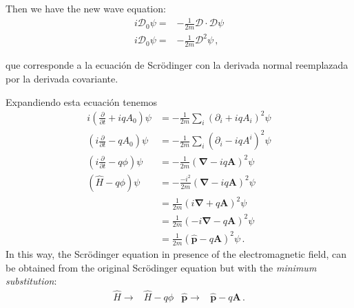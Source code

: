 Then we have the new wave equation:
\begin{align}
  i\mathcal{D}_0\psi=&-\frac{1}{2m}\boldsymbol{\mathcal{D}}\cdot\boldsymbol{\mathcal{D}}\psi\nonumber\\
i\mathcal{D}_0\psi=&-\frac{1}{2m}\boldsymbol{\mathcal{D}}^2\psi\,,
\end{align}

que corresponde a la ecuación de Scrödinger con la derivada normal reemplazada por la derivada covariante.



Expandiendo esta ecuación tenemos
\begin{align}
\label{eq:175qft}
   i\left(\frac{\partial}{\partial t}+iqA_0\right)\psi
&=-\frac{1}{2m}\sum_i(\partial_i+i q A_i)^2\psi\nonumber\\
   \left(i\frac{\partial}{\partial t}-qA_0\right)\psi
 &=-\frac{1}{2m}\sum_i(\partial_i-i q A^i)^2\psi\nonumber\\
   \left(i\frac{\partial}{\partial t}-q\phi\right)\psi
&=-\frac{1}{2m}(\boldsymbol{\nabla}-i q \mathbf{A})^2\psi\nonumber\\
   \left(\widehat{H}-q\phi\right)\psi
&=-\frac{-i^2}{2m}(\boldsymbol{\nabla}-i q \mathbf{A})^2\psi\nonumber\\
&=\frac{1}{2m}(i\boldsymbol{\nabla}+ q \mathbf{A})^2\psi\nonumber\\
&=\frac{1}{2m}(-i\boldsymbol{\nabla}- q \mathbf{A})^2\psi\nonumber\\
&=\frac{1}{2m}(\widehat{\mathbf{p}}- q \mathbf{A})^2\psi\,.
\end{align}
In this way, the Scrödinger equation in presence of the electromagnetic field, can be obtained from the original Scrödinger equation but with the \emph{minimum substitution}:
\begin{align}
  \widehat{H}\to& \widehat{H}-q\phi & \widehat{\mathbf{p}}\to&\widehat{\mathbf{p}}-q\mathbf{A}\,.
\end{align}



